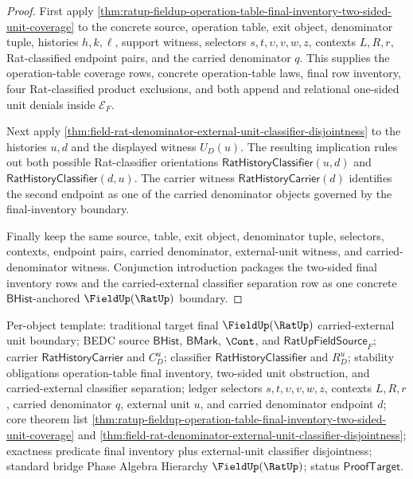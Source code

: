 \begin{proof}
First apply
\autoref{thm:ratup-fieldup-operation-table-final-inventory-two-sided-unit-coverage}
to the concrete source, operation table, exit object, denominator tuple,
histories $h,k,\ell$, support witness, selectors $s,t,\upsilon,v,w,z$,
contexts $L,R,r$, Rat-classified endpoint pairs, and the carried denominator
$q$. This supplies the operation-table coverage rows, concrete operation-table
laws, final row inventory, four Rat-classified product exclusions, and both
append and relational one-sided unit denials inside $\mathcal E_F$.

Next apply
\autoref{thm:field-rat-denominator-external-unit-classifier-disjointness} to
the histories $u,d$ and the displayed witness $U_D(u)$. The resulting
implication rules out both possible Rat-classifier orientations
$\mathsf{RatHistoryClassifier}(u,d)$ and
$\mathsf{RatHistoryClassifier}(d,u)$. The carrier witness
$\mathsf{RatHistoryCarrier}(d)$ identifies the second endpoint as one of the
carried denominator objects governed by the final-inventory boundary.

Finally keep the same source, table, exit object, denominator tuple, selectors,
contexts, endpoint pairs, carried denominator, external-unit witness, and
carried-denominator witness. Conjunction introduction packages the
two-sided final inventory rows and the carried-external classifier separation
row as one concrete $\mathsf{BHist}$-anchored $\FieldUp(\RatUp)$ boundary.
\end{proof}

Per-object template: traditional target final $\FieldUp(\RatUp)$
carried-external unit boundary; BEDC source $\mathsf{BHist}$, $\mathsf{BMark}$,
$\Cont$, and $\mathsf{RatUpFieldSource}_F$; carrier
$\mathsf{RatHistoryCarrier}$ and $C_D^u$; classifier
$\mathsf{RatHistoryClassifier}$ and $R_D^u$; stability obligations
operation-table final inventory, two-sided unit obstruction, and
carried-external classifier separation; ledger selectors
$s,t,\upsilon,v,w,z$, contexts $L,R,r$, carried denominator $q$, external unit
$u$, and carried denominator endpoint $d$; core theorem list
\autoref{thm:ratup-fieldup-operation-table-final-inventory-two-sided-unit-coverage}
and
\autoref{thm:field-rat-denominator-external-unit-classifier-disjointness};
exactness predicate final inventory plus external-unit classifier
disjointness; standard bridge Phase Algebra Hierarchy $\FieldUp(\RatUp)$;
status $\mathsf{ProofTarget}$.

